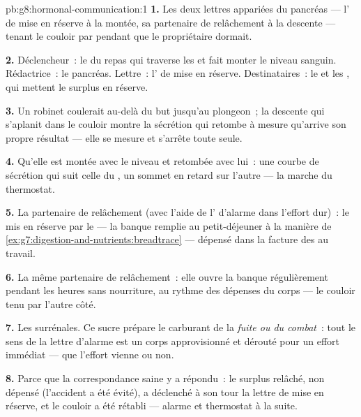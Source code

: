 \begin{solution}{pb:g8:hormonal-communication:1}
\textbf{1.} Les deux lettres appariées du pancréas ---
l' de mise en réserve à la montée, sa partenaire de
relâchement à la descente --- tenant le couloir par
 pendant que le propriétaire dormait.

\textbf{2.} Déclencheur~: le  du repas qui traverse
les  et fait monter le niveau sanguin.
Rédactrice~: le pancréas. Lettre~: l' de mise en
réserve. Destinataires~: le  et les , qui mettent
le surplus en réserve.

\textbf{3.} Un robinet coulerait au-delà du but jusqu'au
plongeon~; la descente qui s'aplanit dans le couloir montre
la sécrétion qui retombe à mesure qu'arrive son propre
résultat --- elle se mesure et s'arrête toute seule.

\textbf{4.} Qu'elle est montée avec le niveau et retombée
avec lui~: une courbe de sécrétion qui suit celle du
, un sommet en retard sur l'autre --- la marche du
thermostat.

\textbf{5.} La partenaire de relâchement (avec l'aide de
l' d'alarme dans l'effort dur)~: le  mis en
réserve par le  --- la banque remplie au petit-déjeuner
à la manière de
\cref{ex:g7:digestion-and-nutrients:breadtrace} --- dépensé
dans la facture des  au travail.

\textbf{6.} La même partenaire de relâchement~: elle ouvre
la banque régulièrement pendant les heures sans nourriture,
au rythme des dépenses du corps --- le couloir tenu par
l'autre côté.

\textbf{7.} Les  surrénales. Ce sucre prépare le
carburant de la \emph{fuite ou du combat}~: tout le sens de
la lettre d'alarme est un corps approvisionné et dérouté
pour un effort immédiat --- que l'effort vienne ou non.

\textbf{8.} Parce que la correspondance saine y a répondu~:
le surplus relâché, non dépensé (l'accident a été évité), a
déclenché à son tour la lettre de mise en réserve, et le
couloir a été rétabli --- alarme et thermostat à la suite.


\end{solution}
